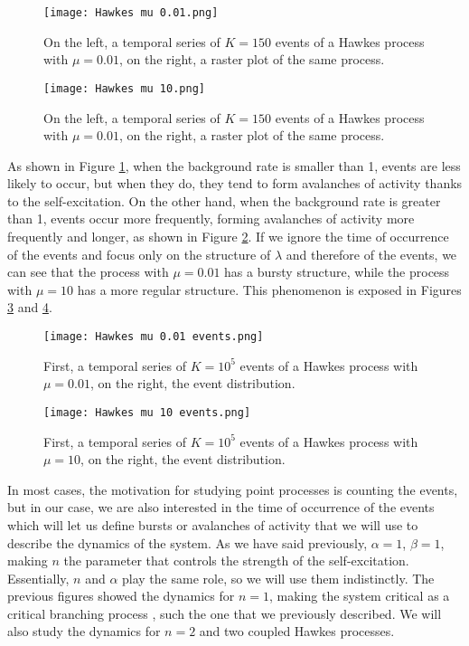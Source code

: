 \begin{figure}[H]
    \centering
    \texttt{[image: Hawkes mu 0.01.png]}
    \caption{On the left, a temporal series of $K=150$ events of a Hawkes process with $\mu=0.01$, on the right, a raster plot of the same process.}
    \label{f: Hawkes rate}
\end{figure}

\begin{figure}[H]
    \centering
    \texttt{[image: Hawkes mu 10.png]}
    \caption{On the left, a temporal series of $K=150$ events of a Hawkes process with $\mu=0.01$, on the right, a raster plot of the same process.}
    \label{f: Hawkes rate 2}
\end{figure}

As shown in Figure \ref{f: Hawkes rate}, when the background rate is smaller than 1, events are less likely to occur, but when they do, they tend to form avalanches of activity thanks 
to the self-excitation. On the other hand, when the background rate is greater than 1, events occur more frequently, forming avalanches of activity more frequently and longer, as
shown in Figure \ref{f: Hawkes rate 2}. If we ignore the time of occurrence of the events and focus only on the structure of $\lambda$ and therefore of the events, we can see that
the process with $\mu=0.01$ has a bursty structure, while the process with $\mu=10$ has a more regular structure. This phenomenon is exposed in Figures \ref{f: Hawkes rate burst} and
\ref{f: Hawkes rate burst 2}.

\begin{figure}[H]
    \centering
    \texttt{[image: Hawkes mu 0.01 events.png]}
    \caption{First, a temporal series of $K=10^5$ events of a Hawkes process with $\mu=0.01$, on the right, the event distribution.}
    \label{f: Hawkes rate burst}    
\end{figure}

\begin{figure}[H]
    \centering
    \texttt{[image: Hawkes mu 10 events.png]}
    \caption{First, a temporal series of $K=10^5$ events of a Hawkes process with $\mu=10$, on the right, the event distribution.}
    \label{f: Hawkes rate burst 2}    
\end{figure}

In most cases, the motivation for studying point processes is counting the events, but in our case, we are also interested in the time of occurrence of the events
which will let us define bursts or avalanches of activity that we will use to describe the dynamics of the system. 
As we have said previously, $\alpha = 1$, $\beta = 1$, making $n$ the parameter that controls the strength of the self-excitation. Essentially, $n$ and $\alpha$ play the same role,
so we will use them indistinctly. The previous figures showed the dynamics for $n=1$, making the system critical as a critical branching process \cite{notarmuzi2021percolation}, 
such the one that we previously described. We will also study the dynamics for $n=2$ and two coupled Hawkes processes.

